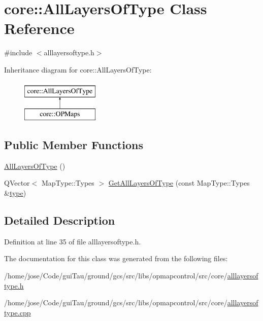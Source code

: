 \hypertarget{classcore_1_1_all_layers_of_type}{\section{core\-:\-:All\-Layers\-Of\-Type Class Reference}
\label{classcore_1_1_all_layers_of_type}
}


{\ttfamily \#include $<$alllayersoftype.\-h$>$}

Inheritance diagram for core\-:\-:All\-Layers\-Of\-Type\-:\begin{figure}[H]
\begin{center}
\leavevmode
\includegraphics[height=2.000000cm]{classcore_1_1_all_layers_of_type}
\end{center}
\end{figure}
\subsection*{Public Member Functions}
\begin{DoxyCompactItemize}
\item 
\hyperlink{group___o_p_map_widget_gac9c4b0c8a890cbccd4a9c16a57be28c4}{All\-Layers\-Of\-Type} ()
\item 
Q\-Vector$<$ Map\-Type\-::\-Types $>$ \hyperlink{group___o_p_map_widget_gaa620f4fda0c58c2ff2919a2fef795074}{Get\-All\-Layers\-Of\-Type} (const Map\-Type\-::\-Types \&\hyperlink{glext_8h_a7d05960f4f1c1b11f3177dc963a45d86}{type})
\end{DoxyCompactItemize}


\subsection{Detailed Description}


Definition at line 35 of file alllayersoftype.\-h.



The documentation for this class was generated from the following files\-:\begin{DoxyCompactItemize}
\item 
/home/jose/\-Code/gui\-Tau/ground/gcs/src/libs/opmapcontrol/src/core/\hyperlink{alllayersoftype_8h}{alllayersoftype.\-h}\item 
/home/jose/\-Code/gui\-Tau/ground/gcs/src/libs/opmapcontrol/src/core/\hyperlink{alllayersoftype_8cpp}{alllayersoftype.\-cpp}\end{DoxyCompactItemize}

